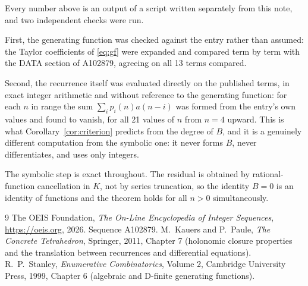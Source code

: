 \documentclass[11pt,a4paper]{article}
\theoremstyle{plain}
\theoremstyle{definition}
\begin{document}
Every number above is an output of a script written separately from this note, and two
independent checks were run.

First, the generating function was checked against the entry rather than assumed: the
Taylor coefficients of \eqref{eq:gf} were expanded and compared term by term with the DATA
section of A102879, agreeing on all 13 terms compared.

Second, the recurrence itself was evaluated directly on the published terms, in exact
integer arithmetic and without reference to the generating function: for each $n$ in range
the sum $\sum_{i}p_{i}(n)a(n-i)$ was formed from the entry's own values and found to
vanish, for all 21 values of $n$ from $n=4$ upward. This is what
Corollary~\ref{cor:criterion} predicts from the degree of $B$, and it is a genuinely
different computation from the symbolic one: it never forms $B$, never differentiates, and
uses only integers.

The symbolic step is exact throughout. The residual is obtained by rational-function
cancellation in $K$, not by series truncation, so the identity $B=0$ is an
identity of functions and the theorem holds for all $n>0$ simultaneously.

\begin{thebibliography}{9}
 The OEIS Foundation, \emph{The On-Line Encyclopedia of Integer Sequences},
\url{https://oeis.org}, 2026. Sequence A102879.
 M.~Kauers and P.~Paule, \emph{The Concrete Tetrahedron}, Springer, 2011,
Chapter 7 (holonomic closure properties and the translation between recurrences and
differential equations).
 R.~P.~Stanley, \emph{Enumerative Combinatorics}, Volume 2, Cambridge
University Press, 1999, Chapter 6 (algebraic and D-finite generating functions).
\end{thebibliography}
\end{document}
